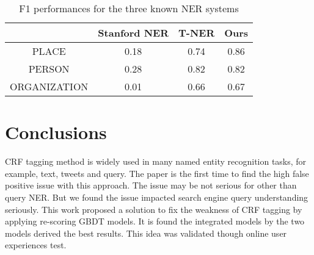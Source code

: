 \documentclass{acm_proc_article-sp}
\begin{document}
\begin{table}
\begin{center}
\begin{tabular}{|c|c|c|c|}
\hline
& Stanford NER & T-NER & Ours\\ \hline
PLACE & 0.18 & 0.74 & 0.86 \\ \hline
PERSON & 0.28 & 0.82 & 0.82 \\ \hline
ORGANIZATION & 0.01 & 0.66 & 0.67\\\hline
\end{tabular}
\caption{F1 performances for the three known NER systems }
\label{table:system comparison}
\end{center}
\end{table}

\section{Conclusions}
CRF tagging method is widely used in many named entity recognition tasks, for example, text, tweets and query. The paper is the first time to find the high false positive issue with this approach.
The issue may be not serious for other than query NER. But we found the issue impacted search engine query understanding seriously. 
This work proposed a solution to fix the weakness of CRF tagging by applying re-scoring GBDT models. 
It is found the integrated models by the two models derived the best results. This idea was validated though online user experiences test. 






\end{document}
